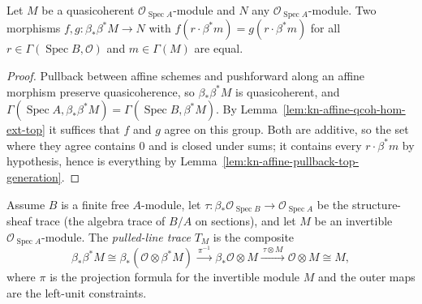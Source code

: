 \begin{lemma}
\label{lem:kn-affine-pushforward-pullback-hom-ext}
\leanok
Let $M$ be a quasicoherent $\mathcal O_{\operatorname{Spec}A}$-module and $N$ any
$\mathcal O_{\operatorname{Spec}A}$-module. Two morphisms $f,g:\beta_*\beta^*M\to N$ with
$f(r\cdot\beta^*m)=g(r\cdot\beta^*m)$ for all $r\in\Gamma(\operatorname{Spec}B,\mathcal O)$
and $m\in\Gamma(M)$ are equal.
\end{lemma}
\begin{proof}
Pullback between affine schemes and pushforward along an affine morphism preserve
quasicoherence, so $\beta_*\beta^*M$ is quasicoherent, and
$\Gamma(\operatorname{Spec}A,\beta_*\beta^*M)=\Gamma(\operatorname{Spec}B,\beta^*M)$. By
Lemma~\ref{lem:kn-affine-qcoh-hom-ext-top} it suffices that $f$ and $g$ agree on this group.
Both are additive, so the set where they agree contains $0$ and is closed under sums; it
contains every $r\cdot\beta^*m$ by hypothesis, hence is everything by
Lemma~\ref{lem:kn-affine-pullback-top-generation}.
\end{proof}

\begin{definition}
\label{def:kn-affine-pulled-line-trace}
\leanok
Assume $B$ is a finite free $A$-module, let
$\tau:\beta_*\mathcal O_{\operatorname{Spec}B}\to\mathcal O_{\operatorname{Spec}A}$ be the
structure-sheaf trace (the algebra trace of $B/A$ on sections), and let $M$ be an invertible
$\mathcal O_{\operatorname{Spec}A}$-module. The \emph{pulled-line trace} $T_M$ is the composite
\[
 \beta_*\beta^*M\cong\beta_*(\mathcal O\otimes\beta^*M)
 \xrightarrow{\ \pi^{-1}\ }\beta_*\mathcal O\otimes M
 \xrightarrow{\ \tau\otimes M\ }\mathcal O\otimes M\cong M,
\]
where $\pi$ is the projection formula for the invertible module $M$ and the outer maps are
the left-unit constraints.
\end{definition}


